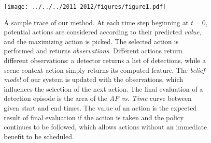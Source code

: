 \begin{figure}[ht]
\centering
\texttt{[image: ../../../2011-2012/figures/figure1.pdf]}
\caption[A sample trace of our Anytime sequential process detection method.]{
A sample trace of our method.
At each time step beginning at $t=0$, potential actions are considered according to their predicted \emph{value}, and the maximizing action is picked.
The selected action is performed and returns \emph{observations}.
Different actions return different observations: a detector returns a list of detections, while a scene context action simply returns its computed feature.
The \emph{belief model} of our system is updated with the observations, which influences the selection of the next action.
The final evaluation of a detection episode is the area of the \emph{AP vs. Time} curve between given start and end times.
The value of an action is the expected result of final evaluation if the action is taken and the policy continues to be followed, which allows actions without an immediate benefit to be scheduled.
}\label{fig:det_figure1}
\end{figure}
